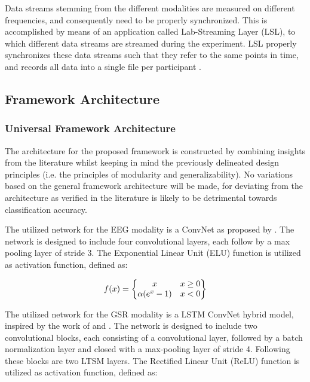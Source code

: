 \documentclass[12pt]{article}
\begin{document}
Data streams stemming from the different modalities are measured on different frequencies, and consequently need to be properly synchronized. This is accomplished by means of an application called Lab-Streaming Layer (LSL), to which different data streams are streamed during the experiment. LSL properly synchronizes these data streams such that they refer to the same points in time, and records all data into a single file per participant \cite{kothe2018lab}.

\subsection{Framework Architecture}

\subsubsection{Universal Framework Architecture}
The architecture for the proposed framework is constructed by combining insights from the literature whilst keeping in mind the previously delineated design principles (i.e. the principles of modularity and generalizability). No variations based on the general framework architecture will be made, for deviating from the architecture as verified in the literature is likely to be detrimental towards classification accuracy.

The utilized network for the EEG modality is a ConvNet as proposed by . The network is designed to include four convolutional layers, each follow by a max pooling layer of stride 3. The Exponential Linear Unit (ELU) function is utilized as activation function, defined as: 

\begin{equation}
f(x)= 
\begin{Bmatrix}
x & x \geq0 \\ 
\alpha (e^x -1) & x<0
\end{Bmatrix}
\bigskip
\end{equation}

The utilized network for the GSR modality is a LSTM ConvNet hybrid model, inspired by the work of  and  . The network is designed to include two convolutional blocks, each consisting of a convolutional layer, followed by a batch normalization layer and closed with a max-pooling layer of stride 4. Following these blocks are two LTSM layers. The Rectified Linear Unit (ReLU) function is utilized as activation function, defined as: 
\end{document}
